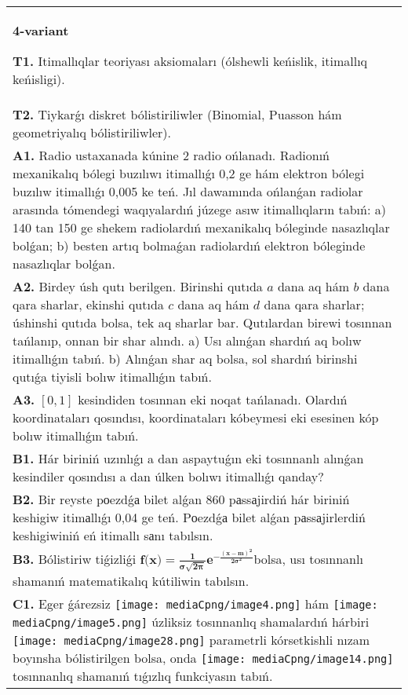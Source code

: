 \documentclass{article}
\begin{document}
\begin{tabular}{m{17cm}}
\textbf{4-variant}
\newline

\textbf{T1.} Itimallıqlar teoriyası aksiomaları (ólshewli keńislik, itimallıq keńisligi).
 \\
\textbf{T2.} Tiykarǵı diskret bólistiriliwler (Binomial, Puasson hám geometriyalıq bólistiriliwler).
 \\
\textbf{A1.} Radio ustaxanada kúnine 2 radio ońlanadı. Radionıń mexanikalıq bólegi buzılıwı itimallıǵı 0,2 ge hám elektron bólegi buzılıw itimallıǵı 0,005 ke teń. Jıl dawamında ońlanǵan radiolar arasında tómendegi waqıyalardıń júzege asıw itimallıqların tabıń: a) 140 tan 150 ge shekem radiolardıń mexanikalıq bóleginde nasazlıqlar bolǵan; b) besten artıq bolmaǵan radiolardıń elektron bóleginde nasazlıqlar bolǵan.
 \\
\textbf{A2.} Birdey úsh qutı berilgen. Birinshi qutıda $a$ dana aq hám $b$ dana qara sharlar, ekinshi qutıda $c$ dana aq hám $d$ dana qara sharlar; úshinshi qutıda bolsa, tek aq sharlar bar. Qutılardan birewi tosınnan tańlanıp, onnan bir shar alındı. a) Usı alınǵan shardıń aq bolıw itimallıǵın tabıń. b) Alınǵan shar aq bolsa, sol shardıń birinshi qutıǵa tiyisli bolıw itimallıǵın tabıń.
 \\
\textbf{A3.} $\left[ 0,1 \right]$ kesindiden tosınnan eki noqat tańlanadı. Olardıń koordinataları qosındısı, koordinataları kóbeymesi eki esesinen kóp bolıw itimallıǵın tabıń.
 \\
\textbf{B1.} Hár biriniń uzınlıǵı a dan aspaytuǵın eki tosınnanlı alınǵan kesindiler qosındısı a dan úlken bolıwı itimallıǵı qanday?
 \\
\textbf{B2.} Bir reyste pоezdǵа bilet alǵan 860 pаssаjirdiń hár biriniń keshigiw itimаllıǵı 0,04 ge teń. Pоezdǵа bilet alǵan pаssаjirlerdiń keshigiwiniń eń itimallı sаnı tabılsın.
 \\
\textbf{B3.} Bólistiriw tiǵizliǵi \(\mathbf{f}\mathbf{(}\mathbf{x}\mathbf{)}\mathbf{=}\frac{\mathbf{1}}{\mathbf{\sigma}\sqrt{\mathbf{2}\mathbf{\pi}}}\mathbf{e}^{\mathbf{-}\frac{\left( \mathbf{x - m} \right)^{\mathbf{2}}}{\mathbf{2}\mathbf{\sigma}^{\mathbf{2}}}}\)bolsa, usı tosınnanlı shamanıń matematikalıq kútiliwin tabılsın.
 \\
\textbf{C1.} Eger ǵárezsiz \texttt{[image: mediaCpng/image4.png]} hám \texttt{[image: mediaCpng/image5.png]} úzliksiz tosınnanlıq shamalardıń hárbiri \texttt{[image: mediaCpng/image28.png]} parametrli kórsetkishli nızam boyınsha bólistirilgen bolsa, onda \texttt{[image: mediaCpng/image14.png]} tosınnanlıq shamanıń tıǵızlıq funkciyasın tabıń.

\end{tabular}
\end{document}
